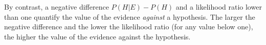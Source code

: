 \documentclass[10pt]{article}
\begin{document}
%
%

 By contrast, a negative difference $P(H | E) - P(H)$ and a likelihood ratio lower than one  
quantify the value of the evidence \textit{against} a hypothesis.
The larger the negative difference and the lower the likelihood ratio (for any value below one), 
the higher the value of the evidence against the hypothesis.
\end{document}
